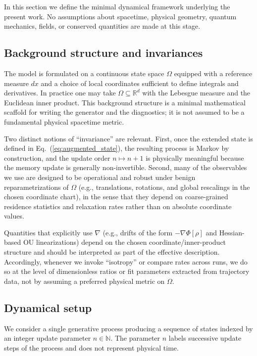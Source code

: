 \documentclass[reprint,amsmath,amssymb,aps,prd,nofootinbib,floatfix]{revtex4-2}
\begin{document}
In this section we define the minimal dynamical framework underlying the present work.
No assumptions about spacetime, physical geometry, quantum mechanics, fields, or conserved quantities are made at this stage.

\subsection{Background structure and invariances}\label{sec:background_invariances}

The model is formulated on a continuous state space $\Omega$ equipped with a reference measure $dx$ and a choice of local coordinates sufficient to define integrals and derivatives.
In practice one may take $\Omega\subseteq\mathbb{R}^d$ with the Lebesgue measure and the Euclidean inner product.
This background structure is a minimal mathematical scaffold for writing the generator and the diagnostics; it is not assumed to be a fundamental physical spacetime metric.

Two distinct notions of ``invariance'' are relevant.
First, once the extended state is defined in Eq.~(\ref{eq:augmented_state}), the resulting process is Markov by construction, and the update order $n\mapsto n+1$ is physically meaningful because the memory update is generally non-invertible.
Second, many of the observables we use are designed to be operational and robust under benign reparametrizations of $\Omega$ (e.g., translations, rotations, and global rescalings in the chosen coordinate chart), in the sense that they depend on coarse-grained residence statistics and relaxation rates rather than on absolute coordinate values.

Quantities that explicitly use $\nabla$ (e.g., drifts of the form $-\nabla\Phi[\rho]$ and Hessian-based OU linearizations) depend on the chosen coordinate/inner-product structure and should be interpreted as part of the effective description.
Accordingly, whenever we invoke ``isotropy'' or compare rates across runs, we do so at the level of dimensionless ratios or fit parameters extracted from trajectory data, not by assuming a preferred physical metric on $\Omega$.

\subsection{Dynamical setup}

We consider a single generative process producing a sequence of states indexed by an integer update parameter $n\in\mathbb{N}$.
The parameter $n$ labels successive update steps of the process and does not represent physical time.
\end{document}
